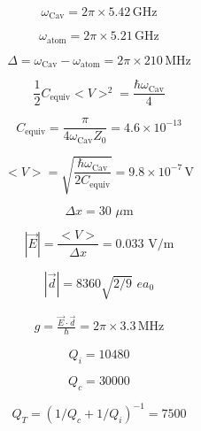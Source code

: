 \documentclass[12pt,reqno]{amsart}
\begin{document}
\setlength{\parindent}{0pt}

\begin{equation}
\omega_\text{Cav} = 2\pi \times 5.42 \, \text{GHz}
\end{equation}

\begin{equation}
\omega_\text{atom} = 2\pi \times 5.21 \, \text{GHz}
\end{equation}

\begin{equation}
\Delta = \omega_\text{Cav} - \omega_\text{atom} = 2\pi \times 210 \,  \text{MHz}
\end{equation}


\begin{equation}
\frac{1}{2}C_\text{equiv}<V>^2 = \frac{\hbar \omega_\text{Cav}}{4}
\end{equation}

\begin{equation}
C_\text{equiv} = \frac{\pi}{4\omega_\text{Cav}Z_0} = 4.6\times 10^{-13}
\end{equation}

\begin{equation}
<V> = \sqrt{ \frac{ \hbar \omega_\text{Cav}}{ 2 C_\text{equiv} } } = 9.8 \times 10^{-7} \, \text{V}
\end{equation}

\begin{equation}
\Delta x = 30 \, \, \mu\text{m}
\end{equation}

\begin{equation}
|\vec{E}| = \frac{<V>}{\Delta x} = 0.033 \, \, \text{V/m}
\end{equation}




\begin{equation}
|\vec{d}| = 8360 \sqrt{2/9} \, \,ea_0
\end{equation}

\begin{eqnarray}
g = \frac{\vec{E} \cdot \vec{d}}{\hbar} = 2\pi \times 3.3 \, \text{MHz}
\end{eqnarray}

\begin{equation}
Q_i = 10480
\end{equation}

\begin{equation}
Q_c = 30000
\end{equation}

\begin{equation}
Q_T = \left(1/Q_c + 1/Q_i\right)^{-1} = 7500
\end{equation}
\end{document}
